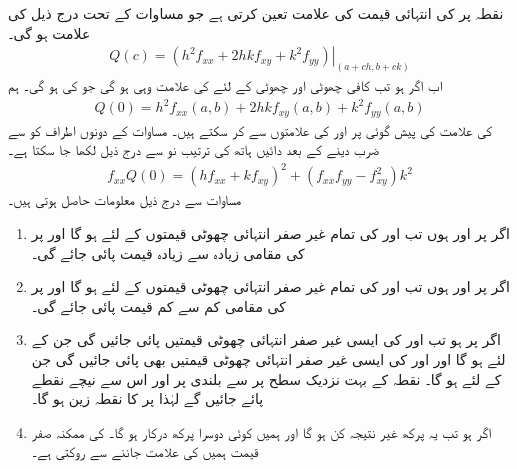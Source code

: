 نقطہ  پر  کی انتہائی قیمت    کی علامت تعین کرتی ہے جو مساوات  کے تحت درج ذیل کی علامت ہو گی۔
\begin{align*}
Q(c)=\left. (h^2f_{xx}+2hkf_{xy}+k^2f_{yy})\right\vert_{(a+ch,b+ck)}
\end{align*}
اب اگر  ہو تب  کافی چھوٹی  اور  چھوٹی  کے لئے  کی علامت  وہی ہو گی جو  کی ہو گی۔ ہم
\begin{align}\label{مساوات_کثیرالمتغیر_ٹیلر_ت}
Q(0)=h^2f_{xx}(a,b)+2hkf_{xy}(a,b)+k^2f_{yy}(a,b)
\end{align}
کی علامت  کی پیش گوئی   پر  اور  کی علامتوں سے کر سکتے ہیں۔ مساوات  کے دونوں اطراف  کو  سے ضرب دینے کے بعد دائیں ہاتھ کی ترتیب نو سے درج ذیل لکھا جا سکتا ہے۔
\begin{align}\label{مساوات_کثیرالمتغیر_ٹیلر_ٹ}
f_{xx}Q(0)=(hf_{xx}+kf_{xy})^2+(f_{xx}f_{yy}-f_{xy}^2)k^2
\end{align}
مساوات  سے درج ذیل معلومات حاصل ہوتی ہیں۔
\begin{enumerate}[1.]
\item
اگر  پر  اور  ہوں تب  اور  کی تمام غیر صفر  انتہائی چھوٹی قیمتوں کے لئے    ہو گا  اور  پر  کی مقامی زیادہ سے زیادہ قیمت پائی جائے گی۔
\item
 اگر  پر  اور  ہوں تب  اور  کی تمام غیر صفر  انتہائی چھوٹی قیمتوں کے لئے    ہو گا  اور  پر  کی مقامی کم سے کم  قیمت پائی جائے گی۔
\item
اگر  پر  ہو تب   اور  کی ایسی  غیر صفر انتہائی چھوٹی قیمتیں پائی جائیں گی جن کے لئے  ہو گا  اور    اور  کی ایسی  غیر صفر انتہائی چھوٹی قیمتیں بھی  پائی جائیں گی جن کے لئے  ہو گا۔ نقطہ  کے بہت نزدیک سطح  پر    سے بلندی پر  اور اس سے نیچے نقطے پائے جائیں گے لہٰذا  پر  کا نقطہ زین ہو گا۔
\item
اگر  ہو تب یہ پرکھ غیر نتیجہ کن ہو گا اور ہمیں کوئی دوسرا پرکھ درکار ہو گا۔  کی ممکنہ صفر قیمت ہمیں   کی علامت جاننے سے روکتی ہے۔ 
\end{enumerate}

